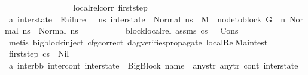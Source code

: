 \begin{isabellebody}
\ \ \ \ \ \ \ \ \isamarkupfalse%
\isanewline
\isanewline
\ \ \ \ \ \ \isamarkupfalse%
\ local{\isacharunderscore}{\kern0pt}rel{\isacharunderscore}{\kern0pt}corr\ first{\isacharunderscore}{\kern0pt}step\ \isanewline
\ \ \ \ \ \ \isamarkupfalse%
\ a{}{\isacharcolon}{\kern0pt}\ {\isachardoublequoteopen}{\isacharparenleft}{\kern0pt}inter{\isacharunderscore}{\kern0pt}state\ {\isasymnoteq}\ Failure\ \ {\isasymand}\ {\isacharparenleft}{\kern0pt}{\isasymforall}ns{}{\isacharprime}{\kern0pt}{\isachardot}{\kern0pt}\ inter{\isacharunderscore}{\kern0pt}state\ {\isacharequal}{\kern0pt}\ Normal\ ns{}{\isacharprime}{\kern0pt}\ {\isasymlongrightarrow}\ {\isacharparenleft}{\kern0pt}M{\isacharcomma}{\kern0pt}{\isasymLambda}{\isacharcomma}{\kern0pt}{\isasymGamma}{\isacharcomma}{\kern0pt}{\isasymOmega}\ {\isasymturnstile}\ {\isasymlangle}{\isacharparenleft}{\kern0pt}node{\isacharunderscore}{\kern0pt}to{\isacharunderscore}{\kern0pt}block\ G\ {\isacharbang}{\kern0pt}\ n{\isacharparenright}{\kern0pt}{\isacharcomma}{\kern0pt}\ Normal\ ns{}{\isasymrangle}\ {\isacharbrackleft}{\kern0pt}{\isasymrightarrow}{\isacharbrackright}{\kern0pt}\ Normal\ ns{}{\isacharprime}{\kern0pt}{\isacharparenright}{\kern0pt}{\isacharparenright}{\kern0pt}{\isacharparenright}{\kern0pt}{\isachardoublequoteclose}\ \isanewline
\ \ \ \ \ \ \ \ \isamarkupfalse%
\ block{\isacharunderscore}{\kern0pt}local{\isacharunderscore}{\kern0pt}rel\ assms{\isacharparenleft}{\kern0pt}{}{\isacharparenright}{\kern0pt}\ {\isacartoucheopen}cs{}\ {\isasymnoteq}\ {\isacharbrackleft}{\kern0pt}{\isacharbrackright}{\kern0pt}{\isacartoucheclose}\ Cons\ \isanewline
\ \ \ \ \ \ \ \ \isamarkupfalse%
\ {\isacharparenleft}{\kern0pt}metis\ bigblock{\isachardot}{\kern0pt}inject\ cfg{\isacharunderscore}{\kern0pt}correct\ dag{\isacharunderscore}{\kern0pt}verifies{\isacharunderscore}{\kern0pt}propagate{\isacharunderscore}{\kern0pt}{}\ local{\isachardot}{\kern0pt}Rel{\isacharunderscore}{\kern0pt}Main{\isacharunderscore}{\kern0pt}test{\isacharparenleft}{\kern0pt}{}{\isacharparenright}{\kern0pt}{\isacharparenright}{\kern0pt}\isanewline
\isanewline
\ \ \ \ \ \ \isamarkupfalse%
\ first{\isacharunderscore}{\kern0pt}step\ {\isacartoucheopen}cs{}\ {\isasymnoteq}\ Nil{\isacartoucheclose}\ \isanewline
\ \ \ \ \ \ \isamarkupfalse%
\ a{}{\isacharcolon}{\kern0pt}\ {\isachardoublequoteopen}{\isacharparenleft}{\kern0pt}inter{\isacharunderscore}{\kern0pt}bb{\isacharcomma}{\kern0pt}\ inter{\isacharunderscore}{\kern0pt}cont{\isacharcomma}{\kern0pt}\ inter{\isacharunderscore}{\kern0pt}state{\isacharparenright}{\kern0pt}\ {\isacharequal}{\kern0pt}\ {\isacharparenleft}{\kern0pt}{\isacharparenleft}{\kern0pt}BigBlock\ name\ {\isacharbrackleft}{\kern0pt}{\isacharbrackright}{\kern0pt}\ any{\isacharunderscore}{\kern0pt}str\ any{\isacharunderscore}{\kern0pt}tr{\isacharparenright}{\kern0pt}{\isacharcomma}{\kern0pt}\ cont{}{\isacharcomma}{\kern0pt}\ inter{\isacharunderscore}{\kern0pt}state{\isacharparenright}{\kern0pt}{\isachardoublequoteclose}\isanewline

\end{isabellebody}

